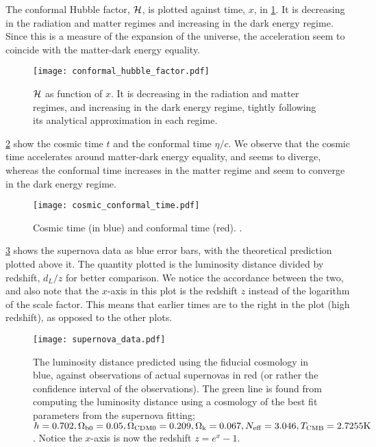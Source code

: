     The conformal Hubble factor, $\mathcal{H}$, is plotted against time, $x$, in \cref{fig:m1:conformal_hubble_factor_Hp}. It is decreasing in the radiation and matter regimes and increasing in the dark energy regime. Since this is a measure of the expansion of the universe, the acceleration seem to coincide with the matter-dark energy equality. 
    \begin{figure}
        \texttt{[image: conformal\_hubble\_factor.pdf]}
        \caption{$\mathcal{H}$ as function of $x$. It is decreasing in the radiation and matter regimes, and increasing in the dark energy regime, tightly following its analytical approximation in each regime.}
        \label{fig:m1:conformal_hubble_factor_Hp}
    \end{figure}

    \cref{fig:m1:cosmic_conformal_time} show the cosmic time $t$ and the conformal time $\eta/c$. We observe that the cosmic time accelerates around matter-dark energy equality, and seems to diverge, whereas the conformal time increases in the matter regime and seem to converge in the dark energy regime.

    \begin{figure}
        \texttt{[image: cosmic\_conformal\_time.pdf]}
        \caption{Cosmic time (in blue) and conformal time (red). .}
        \label{fig:m1:cosmic_conformal_time}
    \end{figure}


    \cref{fig:m1:supernova_data} shows the supernova data as blue error bars, with the theoretical prediction plotted above it. The quantity plotted is the luminosity distance divided by redshift, $d_L/z$ for better comparison. We notice the accordance between the two, and also note that the $x$-axis in this plot is the redshift $z$ instead of the logarithm of the scale factor. This means that earlier times are to the right in the plot (high redshift), as opposed to the other plots. 

    \begin{figure}
        \texttt{[image: supernova\_data.pdf]}
        \caption{The luminosity distance predicted using the fiducial cosmology in blue, against observations of actual supernovas in red (or rather the confidence interval of the observations). The green line is found from computing the luminosity distance using a cosmology of the best fit parameters from the supernova fitting; $h=0.702, \Omega_\mathrm{b0} = 0.05, \Omega_\mathrm{CDM0} = 0.209, \Omega_\mathrm{k}=0.067, N_\mathrm{eff}=3.046, T_\mathrm{CMB}=2.7255 \text{K}$. Notice the $x$-axis is now the redshift $z=e^x-1$.}
        \label{fig:m1:supernova_data}
    \end{figure}

